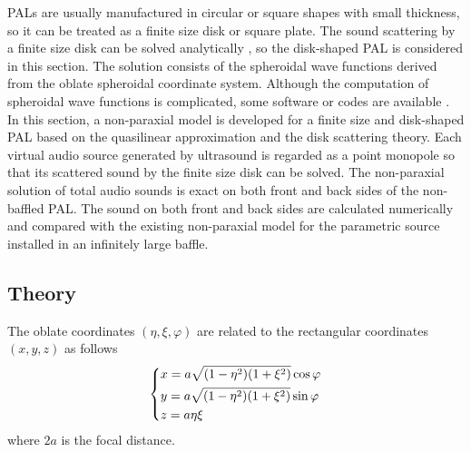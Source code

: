 PALs are usually manufactured in circular or square shapes with small thickness, so it can be treated as a finite size disk or square plate. 
The sound scattering by a finite size disk can be solved analytically \cite{Flammer2005SpheroidalWaveFunctions, Zhong2018EffectsFiniteSize}, so the disk-shaped PAL is considered in this section. 
The solution consists of the spheroidal wave functions derived from the oblate spheroidal coordinate system. 
Although the computation of spheroidal wave functions is complicated, some software or codes are available \cite{Zhang1996ComputationSpecialFunctions, VanBuren2017AccurateCalculationOblate}. 
In this section, 
a non-paraxial model is developed for a finite size and disk-shaped PAL based on the quasilinear approximation and the disk scattering theory. 
Each virtual audio source generated by ultrasound is regarded as a point monopole so that its scattered sound by the finite size disk can be solved. 
The non-paraxial solution of total audio sounds is exact on both front and back sides of the non-baffled PAL.
The sound on both front and back sides are calculated numerically and compared with the existing non-paraxial model for the parametric source installed in an infinitely large baffle. 

\subsection{Theory}
The oblate coordinates $(\eta, \xi,\varphi)$ are related to the rectangular coordinates $(x,y,z)$ as follows \cite{Flammer2005SpheroidalWaveFunctions, Bensoam2021SelfMutualRadiation} 
\begin{equation}
    \begin{dcases}
        x = a \sqrt{(1-\eta^2)(1+\xi^2)}\cos\varphi\\
        y = a\sqrt{(1-\eta^2)(1+\xi^2)}\sin\varphi\\
        z = a\eta \xi 
    \end{dcases}
\end{equation}
where $2a$ is the focal distance.

